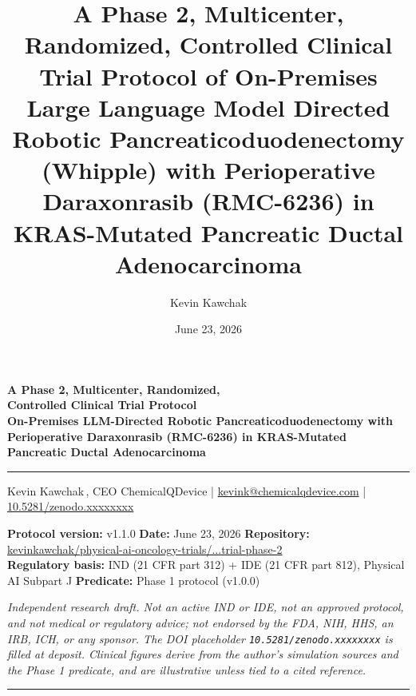 \documentclass[11pt]{article}
\title{A Phase 2, Multicenter, Randomized, Controlled Clinical Trial Protocol of
On-Premises Large Language Model Directed Robotic Pancreaticoduodenectomy
(Whipple) with Perioperative Daraxonrasib (RMC-6236) in KRAS-Mutated Pancreatic
Ductal Adenocarcinoma}
\author{Kevin Kawchak}
\date{June 23, 2026}
\begin{document}
\thispagestyle{plain}

\begin{center}
{\LARGE\bfseries\color{accentcol} A Phase 2, Multicenter, Randomized,\\Controlled Clinical Trial Protocol}\\[0.4em]
{\large\bfseries On-Premises LLM-Directed Robotic Pancreaticoduodenectomy with Perioperative Daraxonrasib (RMC-6236) in KRAS-Mutated Pancreatic
Ductal Adenocarcinoma}\\[0.3em]
{\color{accentcol}\rule{\linewidth}{1.2pt}}
\end{center}

\begin{center}\small
Kevin Kawchak\,, CEO ChemicalQDevice \;|\;
\href{mailto:kevink@chemicalqdevice.com}{kevink@chemicalqdevice.com} \;|\;
\href{https://doi.org/10.5281/zenodo.xxxxxxxx}{10.5281/zenodo.xxxxxxxx}
\end{center}

\begin{center}\footnotesize
\textbf{Protocol version:} v1.1.0 \quad
\textbf{Date:} June 23, 2026 \quad \textbf{Repository:} \href{https://github.com/kevinkawchak/physical-ai-oncology-trials/tree/main/trial-phase-2}{kevinkawchak/physical-ai-oncology-trials/...trial-phase-2} \\
\textbf{Regulatory basis:} IND (21 CFR part 312) + IDE (21 CFR part 812),
Physical AI Subpart J \quad \textbf{Predicate:} Phase 1 protocol (v1.0.0)
\end{center}

\noindent\footnotesize\textit{Independent research draft. Not an active IND or
IDE, not an approved protocol, and not medical or regulatory advice; not endorsed
by the FDA, NIH, HHS, an IRB, ICH, or any sponsor. The DOI placeholder
\texttt{10.5281/zenodo.xxxxxxxx} is filled at deposit. Clinical figures derive
from the author's simulation sources and the Phase 1 predicate, and are
illustrative unless tied to a cited reference.}\normalsize\par

\renewcommand{\keywordname}{\textbf{Keywords}}

\vspace{0.4em}
{\color{accentcol}\rule{\linewidth}{0.6pt}}
\end{document}

